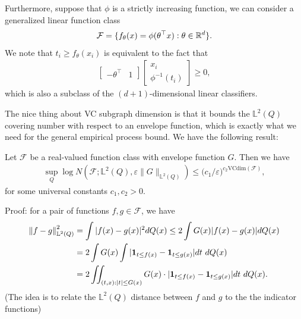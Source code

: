 \documentclass[11pt,letterpaper]{article}
\numberwithin{theorem}{lecture}
\numberwithin{proposition}{lecture}
\numberwithin{lemma}{lecture}
\numberwithin{claim}{lecture}
\numberwithin{corollary}{lecture}
\numberwithin{definition}{lecture}
\numberwithin{conjecture}{lecture}
\numberwithin{remark}{lecture}
\numberwithin{example}{lecture}
\numberwithin{equation}{lecture}
\begin{document}
Furthermore, suppose that $\phi$ is a strictly increasing function, we can consider a generalized linear function class
\begin{align*}
  \mathcal{F} = \{ f_\theta (x) = \phi(\theta^\top x): \theta \in \mathbb{R}^d\}.
\end{align*}
We note that $t_i \geq f_\theta (x_i)$ is equivalent to the fact that
\begin{align*}
  \begin{bmatrix}
    -\theta^\top & 1
  \end{bmatrix}
  \begin{bmatrix}
    x_i\\
    \phi^{-1} (t_i)
  \end{bmatrix} \geq 0,
\end{align*}
which is also a subclass of the $(d + 1)$-dimensional linear classifiers.

The nice thing about VC subgraph dimension is that it bounds the $\mathbb{L}^2 (Q)$ covering number with respect to an envelope function, which is exactly what we need for the general empirical process bound. We have the following result:
\begin{theorem}
  Let $\mathcal{F}$ be a real-valued function class with envelope function $G$. Then we have
  \begin{align*}
   \sup_{Q} \log N (\mathcal{F}; \mathbb{L}^2 (Q), \varepsilon \|G\|_{\mathbb{L}^2 (Q)}) \leq \big( c_1 / \varepsilon \big)^{c_2 \text{VCdim} (\mathcal{F})},
  \end{align*}
  for some universal constants $c_1, c_2 > 0$.
\end{theorem}

Proof: for a pair of functions $f, g \in \mathcal{F}$, we have
\begin{align*}
  \left\| f - g\right\|_{\mathbb{L}^2 (Q)}^2 &= \int |f(x) - g(x)|^2 d Q(x) \leq 2 \int G(x) |f(x) - g(x)| d Q(x)\\
  &=2 \int G(x) \int | \bm{1}_{t \leq f(x)} - \bm{1}_{t \leq g(x)} | dt~ d Q(x)\\
  &= 2 \iint_{(t, x): |t| \leq G(x)} G (x) \cdot | \bm{1}_{t \leq f(x)} - \bm{1}_{t \leq g(x)} | dt~ d Q(x).
\end{align*}
(The idea is to relate the $\mathbb{L}^2 (Q)$ distance between $f$ and $g$ to the the indicator functions)
\end{document}
